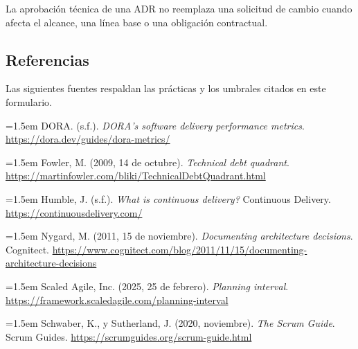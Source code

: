 \documentclass[11pt]{article}
\begin{document}
La aprobación técnica de una ADR no reemplaza una solicitud de cambio cuando afecta el alcance, una línea base o una obligación contractual.

\subsection{Referencias}\label{t10-referencias}

Las siguientes fuentes respaldan las prácticas y los umbrales citados en este formulario.

\noindent\hangindent=1.5em DORA. (s.f.). \emph{DORA's software delivery performance metrics}. \url{https://dora.dev/guides/dora-metrics/}

\noindent\hangindent=1.5em Fowler, M. (2009, 14 de octubre). \emph{Technical debt quadrant}. \url{https://martinfowler.com/bliki/TechnicalDebtQuadrant.html}

\noindent\hangindent=1.5em Humble, J. (s.f.). \emph{What is continuous delivery?} Continuous Delivery. \url{https://continuousdelivery.com/}

\noindent\hangindent=1.5em Nygard, M. (2011, 15 de noviembre). \emph{Documenting architecture decisions}. Cognitect. \url{https://www.cognitect.com/blog/2011/11/15/documenting-architecture-decisions}

\noindent\hangindent=1.5em Scaled Agile, Inc. (2025, 25 de febrero). \emph{Planning interval}. \url{https://framework.scaledagile.com/planning-interval}

\noindent\hangindent=1.5em Schwaber, K., y Sutherland, J. (2020, noviembre). \emph{The Scrum Guide}. Scrum Guides. \url{https://scrumguides.org/scrum-guide.html}

\ossFinalPage
\end{document}
